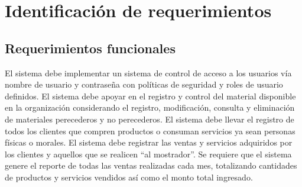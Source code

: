 \documentclass[10pt]{book}
\begin{document}
\thispagestyle{empty}

\maketitle

\frontmatter
\tableofcontents
\listoffigures
\listoftables
\mainmatter


\chapter{Identificación de requerimientos}


\section{Requerimientos funcionales}


\begin{cdtRequirements}[version=0.1, status=\cdtStEdition]
		{El sistema debe implementar un sistema de control de acceso a los usuarios vía nombre de usuario y contraseña con políticas de seguridad y roles de usuario definidos.}
		{El sistema debe apoyar en el registro y control del material disponible en la organización considerando el registro, modificación, consulta y eliminación de materiales perecederos y no perecederos.}
		{El sistema debe llevar el registro de todos los clientes que compren productos o consuman servicios ya sean personas físicas o morales.}
		{El sistema debe registrar las ventas y servicios adquiridos por los clientes y aquellos que se realicen ``al mostrador''.}
		{Se requiere que el sistema genere el reporte de todas las ventas realizadas cada mes, totalizando cantidades de productos y servicios vendidos así como el monto total ingresado.}
\end{cdtRequirements}
\end{document}
